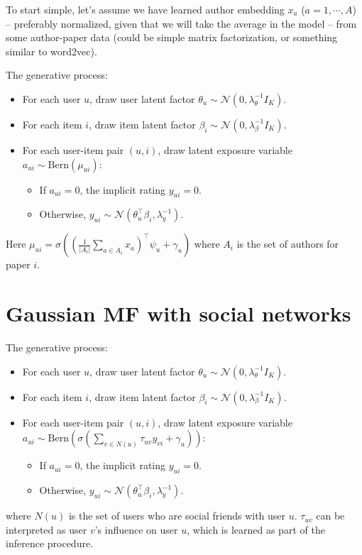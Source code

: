 To start simple, let's assume we have learned author embedding $x_a$ ($a = 1,\cdots, A$) -- preferably normalized, given that we will take the average in the model -- from some author-paper data (could be simple matrix factorization, or something similar to word2vec). 

The generative process:
\begin{itemize}
\item For each user $u$, draw user latent factor $\theta_{u} \sim \mathcal{N}(0, \lambda_\theta^{-1} I_K)$.
\item For each item $i$, draw item latent factor $\beta_{i} \sim \mathcal{N}(0, \lambda_\beta^{-1} I_K)$.
\item For each user-item pair $(u, i)$, draw latent exposure variable $a_{ui} \sim \text{Bern}(\mu_{ui})$:
\begin{itemize}
\item If $a_{ui} = 0$, the implicit rating $y_{ui} = 0$.
\item Otherwise, $y_{ui} \sim \mathcal{N}(\theta_u^\top\beta_i, \lambda_y^{-1})$.
\end{itemize}
\end{itemize}
Here $\mu_{ui} = \sigma((\frac{1}{|A_i|}\sum_{a\in A_i} x_a)^\top \psi_u + \gamma_u)$ where $A_i$ is the set of authors for paper $i$. 


\section{Gaussian MF with social networks}
The generative process:
\begin{itemize}
\item For each user $u$, draw user latent factor $\theta_{u} \sim \mathcal{N}(0, \lambda_\theta^{-1} I_K)$.
\item For each item $i$, draw item latent factor $\beta_{i} \sim \mathcal{N}(0, \lambda_\beta^{-1} I_K)$.
\item For each user-item pair $(u, i)$, draw latent exposure variable $a_{ui} \sim \text{Bern}(\sigma(\sum_{v\in N(u)} \tau_{uv} y_{vi} + \gamma_u))$:
\begin{itemize}
\item If $a_{ui} = 0$, the implicit rating $y_{ui} = 0$.
\item Otherwise, $y_{ui} \sim \mathcal{N}(\theta_u^\top\beta_i, \lambda_y^{-1})$.
\end{itemize}
\end{itemize}
where $N(u)$ is the set of users who are social friends with user $u$. $\tau_{uv}$ can be interpreted as user $v$'s influence on user $u$, which is learned as part of the inference procedure. 

